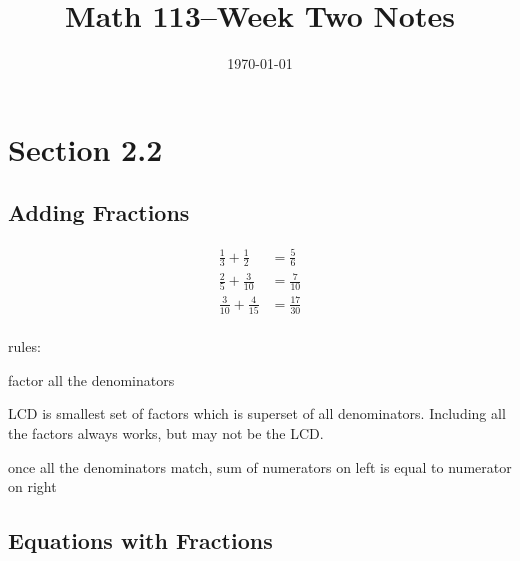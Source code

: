 \documentclass[letterpaper, landscape]{exam}
\title{Math 113--Week Two Notes}
\author{}
\date{\today}
\begin{document}
  \maketitle

  \section{Section 2.2} %
  
  \subsection{Adding Fractions}

  \begin{align*}
    \frac{1}{3} + \frac{1}{2}   & = \frac{5}{6} \\
    \frac{2}{5} + \frac{3}{10}  & = \frac{7}{10} \\
    \frac{3}{10} + \frac{4}{15} & = \frac{17}{30} \\
  \end{align*}

  rules:
  \begin{itemize*}
    \item factor all the denominators
    \item LCD is smallest set of factors which is superset of all denominators.
      Including all the factors always works, but may not be the LCD\@.
    \item once all the denominators match, sum of numerators on left is equal
      to numerator on right
  \end{itemize*}

  \subsection{Equations with Fractions} %
\end{document}
